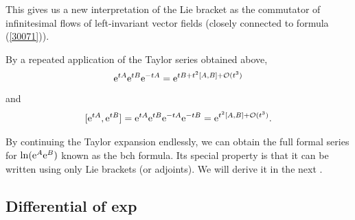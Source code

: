 This gives us a new interpretation of the Lie bracket as the  commutator of infinitesimal flows of left-invariant vector fields (closely connected to formula (\ref{30071})).
\begin{cor}
    By a repeated application of the Taylor series obtained above,
    \[\mathrm{e}^{tA}\mathrm{e}^{tB}\mathrm{e}^{-tA}=\mathrm{e}^{tB+t^2[A,B]+\mathcal{O}(t^3)}\]
    and
    \[[\mathrm{e}^{tA},\mathrm{e}^{tB}]=\mathrm{e}^{tA}\mathrm{e}^{tB}\mathrm{e}^{-tA}\mathrm{e}^{-tB}=\mathrm{e}^{t^2[A,B]+\mathcal{O}(t^3)}.\]
\end{cor}


\begin{rem}
    By continuing the Taylor expansion endlessly, we can obtain the full formal series for $\ln(\mathrm{e}^A \mathrm{e}^B)$ known as the \gls{bch} formula. Its special property is that it can be written using only Lie brackets (or adjoints). We will derive it in the next \sect.
\end{rem}










\subsection{Differential of exp}

